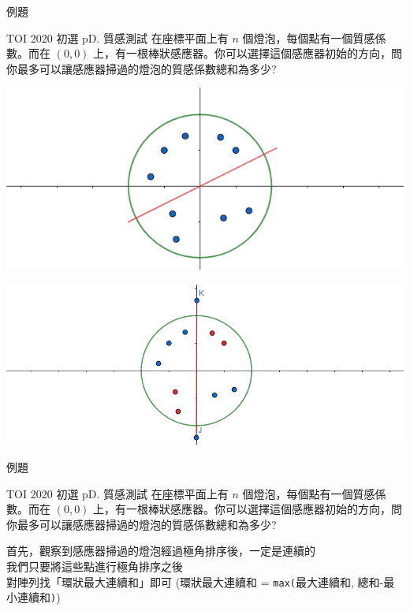\documentclass[aspectratio=169]{beamer}
\begin{document}
\begin{frame}[fragile]{例題}
    \begin{block}{TOI 2020 初選 pD. 質感測試}
        在座標平面上有 $n$ 個燈泡，每個點有一個質感係數。而在 $(0,0)$ 上，有一根棒狀感應器。你可以選擇這個感應器初始的方向，問你最多可以讓感應器掃過的燈泡的質感係數總和為多少?
    \end{block}
    \begin{center}
        \includegraphics[scale=0.25]{images/tioj_2191.png}
    \end{center}
    \begin{center}
        \includegraphics[scale=0.25]{images/tioj_2191_2.png}
    \end{center}
\end{frame}

\begin{frame}[fragile]{例題}
    \begin{block}{TOI 2020 初選 pD. 質感測試}
        在座標平面上有 $n$ 個燈泡，每個點有一個質感係數。而在 $(0,0)$ 上，有一根棒狀感應器。你可以選擇這個感應器初始的方向，問你最多可以讓感應器掃過的燈泡的質感係數總和為多少?
    \end{block}
    首先，觀察到感應器掃過的燈泡經過極角排序後，一定是連續的 \\ \pause
    我們只要將這些點進行極角排序之後 \\
    對陣列找「環狀最大連續和」即可 (環狀最大連續和 = \texttt{max(}最大連續和, 總和-最小連續和\texttt{)})
\end{frame}
\end{document}
